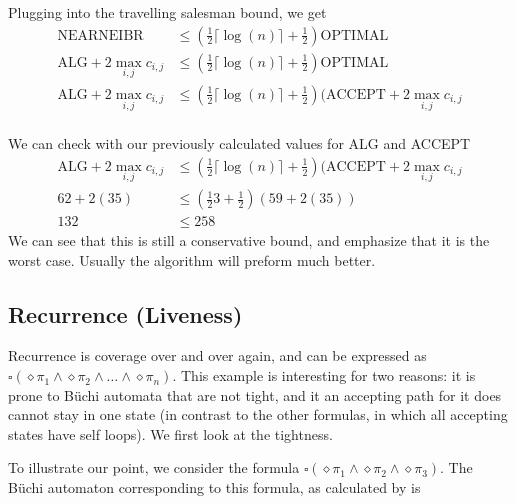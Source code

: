 Plugging into the travelling salesman bound, we get
\begin{align*}
\text{NEARNEIBR} &\leq (\frac{1}{2} \lceil \log(n) \rceil + \frac{1}{2}) \text{OPTIMAL} \\
\text{ALG} + 2\max_{i,j} c_{i,j} &\leq (\frac{1}{2} \lceil \log(n) \rceil + \frac{1}{2}) \text{OPTIMAL} \\
\text{ALG} + 2\max_{i,j} c_{i,j} &\leq (\frac{1}{2} \lceil \log(n) \rceil + \frac{1}{2}) (\text{ACCEPT} + 2 \max_{i,j} c_{i,j} \\ 
\end{align*} 

We can check with our previously calculated values for ALG and ACCEPT
\begin{align*}
\text{ALG} + 2\max_{i,j} c_{i,j} &\leq (\frac{1}{2} \lceil \log(n) \rceil + \frac{1}{2}) (\text{ACCEPT} + 2 \max_{i,j} c_{i,j} \\ 
62 + 2 (35) &\leq (\frac{1}{2} 3 + \frac{1}{2})(59+2(35)) \\
132 &\leq 258
\end{align*}
We can see that this is still a conservative bound, and emphasize that it is the worst case. Usually the algorithm will preform much better.


\subsection{Recurrence (Liveness)}
Recurrence is coverage over and over again, and can be expressed as $\square(\diamond \pi_1 \land \diamond \pi_2 \land \dots \land \diamond \pi_n)$. This example is interesting for two reasons: it is prone to B\"{u}chi automata that are not tight, and it an accepting path for it does cannot stay in one state (in contrast to the other formulas, in which all accepting states have self loops). We first look at the tightness.

To illustrate our point, we consider the formula $\square(\diamond \pi_1 \land \diamond \pi_2 \land \diamond \pi_3)$. The B\"{u}chi automaton corresponding to this formula, as calculated by \cite{gastin01} is 

